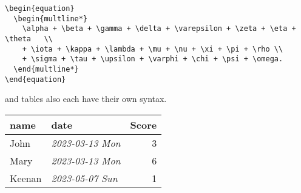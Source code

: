 \documentclass[11pt]{article}
\begin{document}
\lstset{language=LaTeX,label= ,caption= ,captionpos=b,numbers=none}
\begin{lstlisting}
\begin{equation}
  \begin{multline*}
    \alpha + \beta + \gamma + \delta + \varepsilon + \zeta + \eta + \theta   \\
    + \iota + \kappa + \lambda + \mu + \nu + \xi + \pi + \rho \\
    + \sigma + \tau + \upsilon + \varphi + \chi + \psi + \omega.
  \end{multline*}
\end{equation}
\end{lstlisting}

and tables also each have their own syntax.

\begin{center}
\begin{tabular}{llr}
name & date & Score\\
\hline
John & \textit{2023-03-13 Mon} & 3\\
Mary & \textit{2023-03-13 Mon} & 6\\
Keenan & \textit{2023-05-07 Sun} & 1\\
\end{tabular}
\end{center}
\end{document}
